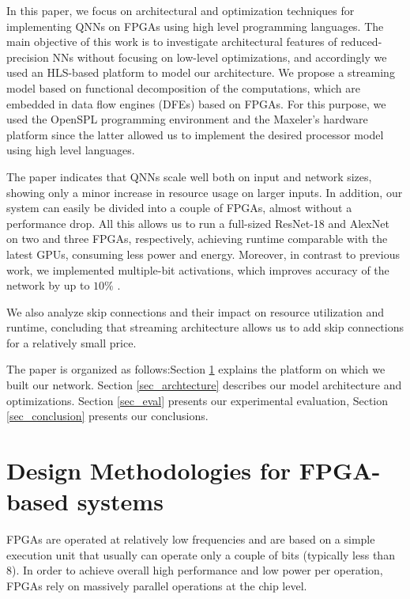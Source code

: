\documentclass[conference]{IEEEtran}
\begin{document}
	In this paper, we focus on architectural and optimization techniques for implementing QNNs on FPGAs using high level programming languages. The main objective of this work is to investigate architectural features of reduced-precision NNs without focusing on low-level optimizations, and accordingly we used an HLS-based platform to model our architecture. We propose a streaming model based on functional decomposition of the computations, which are embedded in data flow engines (DFEs) based on FPGAs. For this purpose, we used the OpenSPL programming environment and the Maxeler's hardware platform since the latter allowed us to implement the desired processor model using high level languages. 
	
	The paper indicates that QNNs scale well both on input and network sizes, showing only a minor increase in resource usage on larger inputs. In addition, our system can easily be divided into a couple of FPGAs, almost without a performance drop. All this allows us to run a full-sized ResNet-18 and AlexNet on two and three FPGAs, respectively, achieving runtime comparable with the latest GPUs, consuming less power and energy. Moreover, in contrast to previous work, we implemented multiple-bit activations, which improves accuracy of the network by up to $10\%$ \cite{DBLP:journals/corr/ZhouNZWWZ16} \cite{DBLP:journals/corr/HubaraCSEB16}.
	
	We also analyze skip connections and their impact on resource utilization and runtime, concluding that streaming architecture allows us to add skip connections for a relatively small price. 
	
	The paper is organized as follows:Section \ref{sec_fpga} explains the platform on which we built our network. Section \ref{sec_archtecture} describes our model architecture and optimizations. Section \ref{sec_eval} presents our experimental evaluation, Section \ref{sec_conclusion} presents our conclusions.
	
	
	\section{Design Methodologies for FPGA-based systems} \label{sec_fpga}
	
	FPGAs are operated at relatively low frequencies and are based on a simple execution unit that usually can operate only a couple of bits (typically less than 8). In order to achieve overall high performance and low power per operation, FPGAs rely on massively parallel operations at the chip level. 
	
\end{document}
